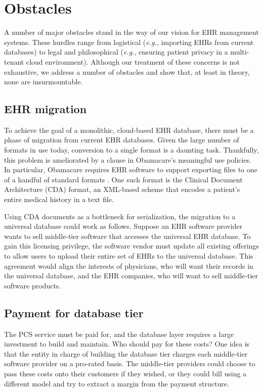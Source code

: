 \section{Obstacles}\label{sec:obstacles}

A number of major obstacles stand in the way of our vision for EHR management systems. These hurdles range from logistical (\textit{e.g.,} importing EHRs from current databases) to legal and philosophical (\textit{e.g.,} ensuring patient privacy in a multi-tenant cloud environment). Although our treatment of these concerns is not exhaustive, we address a number of obstacles and show that, at least in theory, none are insurmountable.

\subsection{EHR migration}

To achieve the goal of a monolithic, cloud-based EHR database, there must be a phase of migration from current EHR databases. Given the large number of formats in use today, conversion to a single format is a daunting task. Thankfully, this problem is ameliorated by a clause in Obamacare's meaningful use policies. In particular, Obamacare requires EHR software to support exporting files to one of a handful of standard formats \cite{Meaningful-Use}. One such format is the Clinical Document Architecture (CDA) format, an XML-based scheme that encodes a patient's entire medical history in a text file.

Using CDA documents as a bottleneck for serialization, the migration to a universal database could work as follows. Suppose an EHR software provider wants to sell middle-tier software that accesses the universal EHR database. To gain this licensing privilege, the software vendor must update all existing offerings to allow users to upload their entire set of EHRs to the universal database. This agreement would align the interests of physicians, who will want their records in the universal database, and the EHR companies, who will want to sell middle-tier software products.

\subsection{Payment for database tier}
The PCS service must be paid for, and the database layer requires a large investment to build and maintain. Who should pay for these costs? One idea is that the entity in charge of building the database tier charges each middle-tier software provider on a pro-rated basis. The middle-tier providers could choose to pass these costs onto their customers if they wished, or they could bill using a different model and try to extract a margin from the payment structure.

